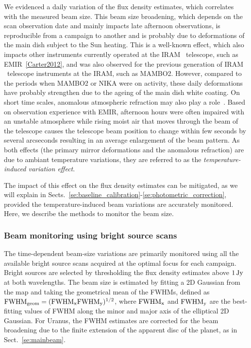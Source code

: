 We evidenced a daily variation of the flux density estimates,
which correlates with the measured beam size.
This beam size broadening, which depends on the
scan observation date and mainly impacts late
afternoon observations, is reproducible from a campaign to another and 
is probably due to deformations of the main dish subject to the Sun
heating. This is a well-known effect, which also impacts other
instruments currently operated at the IRAM \trentemetre\ telescope, such as
EMIR~\ref{Carter2012}, and was also observed for the previous generation of
IRAM \trentemetre\ telescope instruments at the IRAM, such as MAMBO2. However,
compared to the periods when MAMBO2 or NIKA were on activity, these
daily deformations have probably strengthen due to the ageing of the
main dish white coating. On short time scales, anomalous atmospheric
refraction
may also play a role~\citep{Altenhoff1987}. Based on observation
experience with EMIR, afternoon hours were often impaired with an
unstable atmosphere while rising moist air that
moves through the beam of the telescope causes the telescope beam
position to change within few seconds by several arcseconds {\lp resulting
in an average enlargement of the beam pattern. As both effects (the
primary mirror deformations and the anomalous refraction) are due to
ambiant temperature variations, they are referred to as
the \emph{temperature-induced variation effect}.}

The impact of this effect on the flux density estimates can be
mitigated, as we will explain in
Sects.~\ref{se:baseline_calibration}-\ref{se:photometric_correction},
provided the temperature-induced beam variations are accurately
monitored. Here, we describe the methods to monitor the beam size.   


\subsubsection{Beam monitoring using bright source scans}
\label{se:beam_monitoring_otf}

The time-dependent beam-size variations are primarily monitored using
all the available bright source scans acquired at the optimal focus
for each campaign. Bright sources are selected by thresholding the
flux density estimates above $1\,\rm{Jy}$ at both wavelengths.
The beam size is estimated by fitting a 2D Gaussian from the map and
taking the geometrical mean of the FWHMs, defined as 
$\rm{FWHM}_{\rm{geom}} = (\rm{FWHM}_x \rm{FWHM}_y)^{1/2}$, where
$\rm{FWHM}_x$ and $\rm{FWHM}_y$ are the best-fitting values of FWHM
along the minor and major axis of the elliptical 2D Gaussian.
For Uranus, the FWHM estimates are corrected for the beam broadening due
to the finite extension of the apparent disc of the planet, as in Sect.~\ref{se:mainbeam}. 

